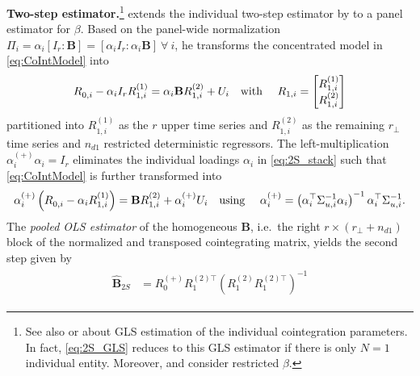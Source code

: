\textbf{Two-step estimator.}\footnote{See also \citet[Ch.~7.2.2]{Lutkepohl2005} or \citet{BruggemannLutkepohl2005} about GLS estimation of the individual cointegration parameters. In fact, \eqref{eq:2S_GLS} reduces to this GLS estimator if there is only $ N=1 $ individual entity. Moreover, \citet[Ch.~7.3.2]{Lutkepohl2005} and \citet[p.~159]{Breitung2005} consider restricted $ \beta $.} 
\citet{Breitung2005} extends the individual two-step estimator by \citet{AhnReisel1990} to a panel estimator for $\beta$. Based on the panel-wide normalization $\Pi_i = \alpha_i \left[I_r : \mathbf{B} \right] = \left[ \alpha_i I_r : \alpha_i \mathbf{B} \right] \ \forall \ i $, he transforms the concentrated model in \eqref{eq:CoIntModel} into
\begin{align} \label{eq:2S_stack}
\begin{split}
	R^{\ }_{0,i} - \alpha_i I_r R_{1,i}^{(1)} & = \alpha_i \mathbf{B} R_{1,i}^{(2)} + U_{i} \text{\quad with \quad}
	R_{1,i} = \begin{bmatrix} R_{1,i}^{(1)} \\ R_{1,i}^{(2)} \end{bmatrix} \\
\end{split}
\end{align}
partitioned into $ R_{1,i}^{(1)} $ as the $ r $ upper time series and $ R_{1,i}^{(2)} $ as the remaining $ r_\perp $ time series and $ n_{d1} $ restricted deterministic regressors. The left-multiplication $ \alpha_{i}^{(+)} \alpha_i = I_r $ eliminates the individual loadings $ \alpha_{i} $ in \eqref{eq:2S_stack} such that \eqref{eq:CoIntModel} is further transformed into
\begin{align} \label{eq:2S_aux}
\begin{split}
	\alpha_{i}^{(+)} \left(R^{\ }_{0,i} - \alpha_{i} R_{1,i}^{(1)} \right) & = \mathbf{B} R_{1,i}^{(2)} + \alpha_{i}^{(+)} U_{i} \text{\quad using \quad} \alpha_{i}^{(+)} = \left( \alpha_i^\top \Sigma_{u,i}^{-1} \alpha_i \right)^{-1} \alpha_i^\top \Sigma_{u,i}^{-1}. \\
\end{split}
\end{align}
The \textit{pooled OLS estimator} of the homogeneous $ \mathbf{B} $, i.e.~the right $ r \times \left( r_\perp + n_{d1} \right) $ block of the normalized and transposed cointegrating matrix, yields the second step given by
\begin{align} \label{eq:2S_GLS}
\begin{split}
	\widehat{\mathbf{B}}_{2S} & = R_0^{(+)} R_1^{(2) \top} \left( R_1^{(2)} R_1^{(2) \top} \right)^{-1}
\end{split}
\end{align}

